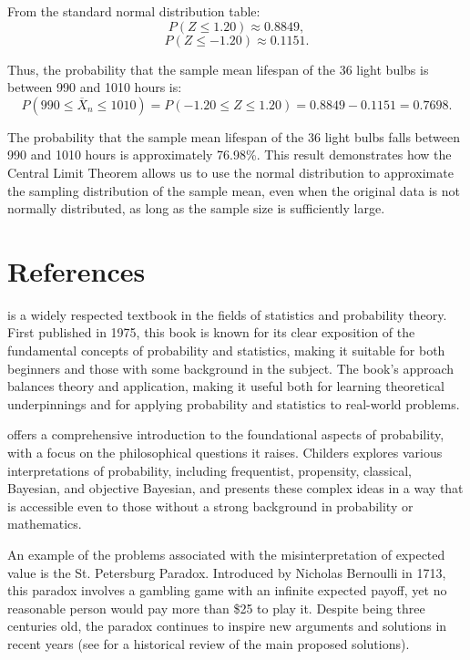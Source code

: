 \begin{example}
From the standard normal distribution table:
\[
P(Z \leq 1.20) \approx 0.8849,
\]
\[
P(Z \leq -1.20) \approx 0.1151.
\]

Thus, the probability that the sample mean lifespan of the 36 light bulbs is between 990 and 1010 hours is:
\[
P(990 \leq \overline{X}_n \leq 1010) = P(-1.20 \leq Z \leq 1.20) = 0.8849 - 0.1151 = 0.7698.
\]

The probability that the sample mean lifespan of the 36 light bulbs falls between 990 and 1010 hours is approximately 76.98\%. This result demonstrates how the Central Limit Theorem allows us to use the normal distribution to approximate the sampling distribution of the sample mean, even when the original data is not normally distributed, as long as the sample size is sufficiently large.
\end{example}

%
%
\section*{References}

\cite{degroot1986probability} is a widely respected textbook in the fields of statistics and probability theory. First published in 1975, this book is known for its clear exposition of the fundamental concepts of probability and statistics, making it suitable for both beginners and those with some background in the subject. The book's approach balances theory and application, making it useful both for learning theoretical underpinnings and for applying probability and statistics to real-world problems.

\cite{childers2013philosophy} offers a comprehensive introduction to the foundational aspects of probability, with a focus on the philosophical questions it raises. Childers explores various interpretations of probability, including frequentist, propensity, classical, Bayesian, and objective Bayesian, and presents these complex ideas in a way that is accessible even to those without a strong background in probability or mathematics.

An example of the problems associated with the misinterpretation of expected value is the St. Petersburg Paradox. Introduced by Nicholas Bernoulli in 1713, this paradox involves a gambling game with an infinite expected payoff, yet no reasonable person would pay more than \$25 to play it. Despite being three centuries old, the paradox continues to inspire new arguments and solutions in recent years (see \cite{huang2013three} for a historical review of the main proposed solutions).
